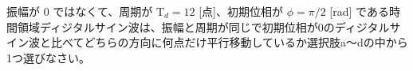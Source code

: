 振幅が $0$ ではなくて、周期が $\textrm{T}_d = 12$ [点]、初期位相が $\phi = \pi/2$ [rad] である時間領域ディジタルサイン波は、振幅と周期が同じで初期位相が$0$のディジタルサイン波と比べてどちらの方向に何点だけ平行移動しているか選択肢a〜dの中から1つ選びなさい。

